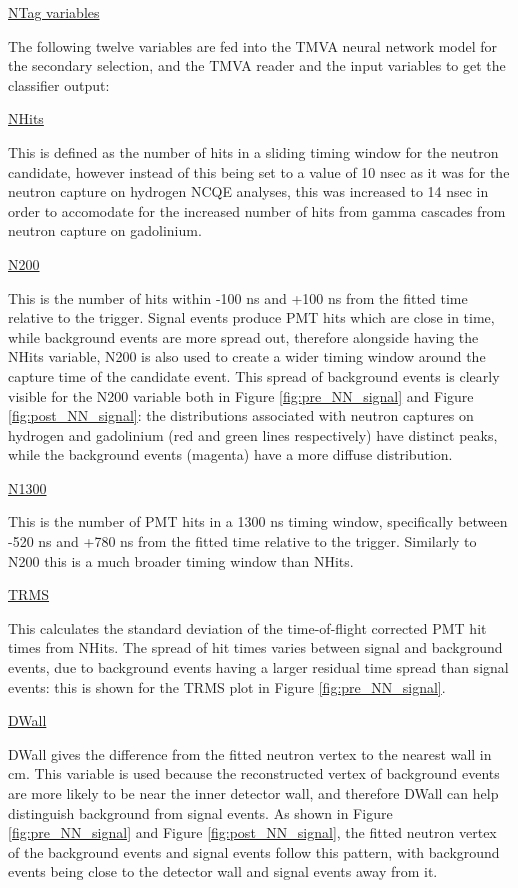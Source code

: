 \underline{NTag variables}

The following twelve variables are fed into the TMVA neural network model for the secondary selection, and the TMVA reader and the input variables to get the classifier output:

\underline{NHits}

This is defined as the number of hits in a sliding timing window for the neutron candidate, however instead of this being set to a value of 10 nsec as it was for the neutron capture on hydrogen NCQE analyses, this was increased to 14 nsec in order to accomodate for the increased number of hits from gamma cascades from neutron capture on gadolinium.

\underline{N200}

This is the number of hits within -100 ns and +100 ns from the fitted time relative to the trigger. Signal events produce PMT hits which are close in time, while background events are more spread out, therefore alongside having the NHits variable, N200 is also used to create a wider timing window around the capture time of the candidate event. This spread of background events is clearly visible for the N200 variable both in Figure \ref{fig:pre_NN_signal} and Figure \ref{fig:post_NN_signal}: the distributions associated with neutron captures on hydrogen and gadolinium (red and green lines respectively) have distinct peaks, while the background events (magenta) have a more diffuse distribution. 

\underline{N1300}

This is the number of PMT hits in a 1300 ns timing window, specifically between -520 ns and +780 ns from the fitted time relative to the trigger. Similarly to N200 this is a much broader timing window than NHits.    

\underline{TRMS}

This calculates the standard deviation of the time-of-flight corrected PMT hit times from NHits. The spread of hit times varies between signal and background events, due to background events having a larger residual time spread than signal events: this is shown for the TRMS plot in Figure \ref{fig:pre_NN_signal}.

\underline{DWall}

DWall gives the difference from the fitted neutron vertex to the nearest wall in cm. This variable is used because the reconstructed vertex of background events are more likely to be near the inner detector wall, and therefore DWall can help distinguish background from signal events. As shown in Figure \ref{fig:pre_NN_signal} and Figure \ref{fig:post_NN_signal}, the fitted neutron vertex of the background events and signal events follow this pattern, with background events being close to the detector wall and signal events away from it.

